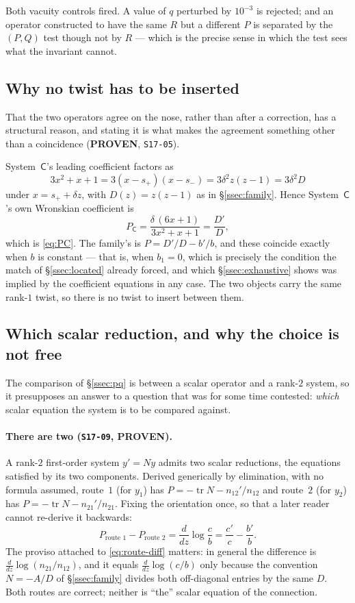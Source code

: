 Both vacuity controls fired. A value of $q$ perturbed by $10^{-3}$ is rejected;
and an operator constructed to have the same $R$ but a different $P$ is
separated by the $(P,Q)$ test though not by $R$ --- which is the precise sense
in which the test sees what the invariant cannot.

\subsection{Why no twist has to be inserted}\label{ssec:notwist}

That the two operators agree on the nose, rather than after a correction, has a
structural reason, and stating it is what makes the agreement something other
than a coincidence (\textbf{PROVEN}, \texttt{S17-05}).

System~$\mathsf C$'s leading coefficient factors as
\[
  3x^2+x+1=3(x-s_+)(x-s_-)=3\delta^2 z(z-1)=3\delta^2 D
\]
under $x=s_++\delta z$, with $D(z)=z(z-1)$ as in \S\ref{ssec:family}. Hence
System~$\mathsf C$'s own Wronskian coefficient is
\[
  P_{\mathsf C}=\frac{\delta\,(6x+1)}{3x^2+x+1}=\frac{D'}{D},
\]
which is \eqref{eq:PC}. The family's is $P=D'/D-b'/b$, and these coincide
exactly when $b$ is constant --- that is, when $b_1=0$, which is precisely the
condition the match of \S\ref{ssec:located} already forced, and which
\S\ref{ssec:exhaustive} shows was implied by the coefficient equations in any
case. The two objects carry the same rank-$1$ twist, so there is no twist to
insert between them.

\subsection{Which scalar reduction, and why the choice is not
free}\label{ssec:route}

The comparison of \S\ref{ssec:pq} is between a scalar operator and a rank-$2$
system, so it presupposes an answer to a question that was for some time
contested: \emph{which} scalar equation the system is to be compared against.

\paragraph{There are two (\texttt{S17-09}, \textbf{PROVEN}).}
A rank-$2$ first-order system $y'=Ny$ admits two scalar reductions, the
equations satisfied by its two components. Derived generically by elimination,
with no formula assumed, route~$1$ (for $y_1$) has
$P=-\operatorname{tr}N-n_{12}'/n_{12}$ and route~$2$ (for $y_2$) has
$P=-\operatorname{tr}N-n_{21}'/n_{21}$. Fixing the orientation once, so that a
later reader cannot re-derive it backwards:
\begin{equation}\label{eq:route-diff}
  P_{\text{route }1}-P_{\text{route }2}
    =\frac{d}{dz}\log\frac{c}{b}
    =\frac{c'}{c}-\frac{b'}{b}.
\end{equation}
The proviso attached to \eqref{eq:route-diff} matters: in general the
difference is $\tfrac{d}{dz}\log(n_{21}/n_{12})$, and it equals
$\tfrac{d}{dz}\log(c/b)$ only because the convention $N=-A/D$ of
\S\ref{ssec:family} divides both off-diagonal entries by the same $D$. Both
routes are correct; neither is ``the'' scalar equation of the connection.


